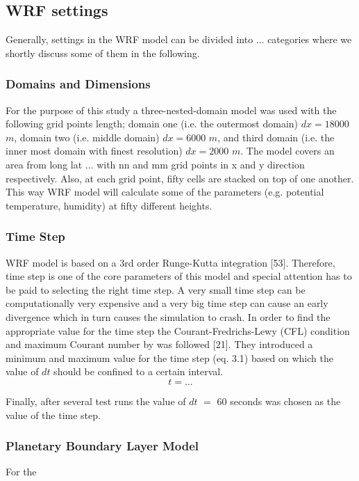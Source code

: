 \documentclass[a4paper,12pt]{article}
\numberwithin{equation}{section} %
\begin{document}
\subsection{WRF settings}
Generally, settings in the WRF model can be divided into ... categories where we shortly discuss some of them in the following.

\subsubsection{Domains and Dimensions}
For the purpose of this study a three-nested-domain model was used with the following grid points length; domain one (i.e. the outermost domain) $dx = 18000$ $m$, domain two (i.e. middle domain) $dx = 6000$ $m$, and third domain (i.e. the inner most domain with finest resolution) $dx = 2000$ $m$. The model covers an area from long lat ... with nn and mm grid points in x and y direction respectively. Also, at each grid point, fifty cells are stacked on top of one another. This way WRF model will calculate some of the parameters (e.g. potential temperature, humidity) at fifty different heights.

\subsubsection{Time Step}
WRF model is based on a 3rd order Runge-Kutta integration [53]. Therefore, time step is one of the core parameters of this model and special attention has to be paid to selecting the right time step. A very small time step can be computationally very expensive and a very big time step can cause an early divergence which in turn causes the simulation to crash. In order to find the appropriate value for the time step the Courant-Fredrichs-Lewy (CFL) condition and maximum Courant number by  was followed [21]. They introduced a minimum and maximum value for the time step (eq. 3.1) based on which the value of $dt$ should be confined to a certain interval.
\vspace{0.25cm}
\begin{equation}
t = ...
\end{equation}

\vspace{0.25cm}

Finally, after several test runs the value of $dt$ $=$ $60$ seconds was chosen as the value of the time step.

\subsubsection{Planetary Boundary Layer Model}

For the 
\end{document}
